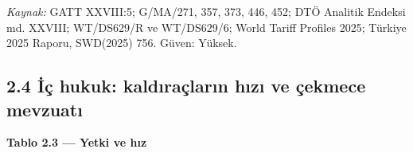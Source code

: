 \endgroup

\emph{Kaynak:} \etiketV{} GATT XXVIII:5; G/MA/271, 357, 373, 446, 452; DTÖ Analitik Endeksi md. XXVIII; WT/DS629/R ve WT/DS629/6; World Tariff Profiles 2025; Türkiye 2025 Raporu, SWD(2025) 756. Güven: Yüksek.

\hypertarget{02c_hazirlik-24-iux307uxe7-hukuk-kaldux131rauxe7larux131n-hux131zux131-ve-uxe7ekmece-mevzuatux131}{%
\subsection{2.4 İç hukuk: kaldıraçların hızı ve çekmece mevzuatı}\label{02c_hazirlik-24-iux307uxe7-hukuk-kaldux131rauxe7larux131n-hux131zux131-ve-uxe7ekmece-mevzuatux131}}


\textbf{Tablo 2.3 --- Yetki ve hız}

\nopagebreak[4]

\begingroup\gbtablo\small

